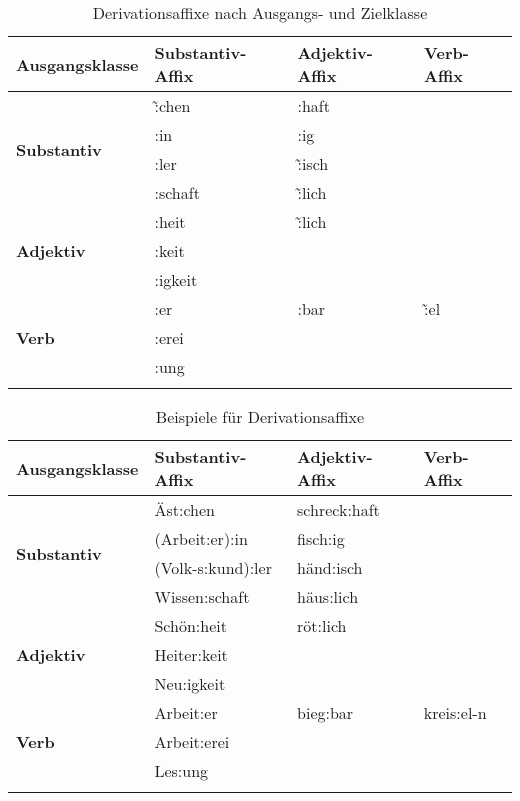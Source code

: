 \begin{table}[!htbp]
  \centering
  \begin{tabular}{llll}
    \lsptoprule
    \textbf{Ausgangsklasse} & \textbf{Substantiv-Affix} & \textbf{Adjektiv-Affix} & \textbf{Verb-Affix} \\
   \midrule
   \multirow{4}{*}{\textbf{Substantiv}} & \~:chen & :haft & \\
   & :in & :ig & \\
   & :ler & \~:isch & \\
   & :schaft & \~:lich & \\
   \midrule
   \multirow{3}{*}{\textbf{Adjektiv}} & :heit & \~:lich & \\
    & :keit && \\
    & :igkeit && \\
   \midrule
   \multirow{3}{*}{\textbf{Verb}} & :er & :bar & \~:el \\
   & :erei && \\
   & :ung && \\
   \lspbottomrule
  \end{tabular}
  \caption{Derivationsaffixe nach Ausgangs- und Zielklasse}
  \label{tab:derivaffixe}
\end{table}

\begin{table}[!htbp]
  \centering
  \begin{tabular}{llll}
    \lsptoprule
    \textbf{Ausgangsklasse} & \textbf{Substantiv-Affix} & \textbf{Adjektiv-Affix} & \textbf{Verb-Affix} \\
   \midrule
   \multirow{4}{*}{\textbf{Substantiv}} & Äst:chen & schreck:haft & \\
   & (Arbeit:er):in & fisch:ig & \\
   & (Volk-s:kund):ler & händ:isch & \\
   & Wissen:schaft & häus:lich & \\
   \midrule
   \multirow{3}{*}{\textbf{Adjektiv}} & Schön:heit & röt:lich & \\
    & Heiter:keit && \\
    & Neu:igkeit && \\
   \midrule
   \multirow{3}{*}{\textbf{Verb}} & Arbeit:er & bieg:bar & kreis:el-n \\
   & Arbeit:erei && \\
   & Les:ung && \\
   \lspbottomrule
  \end{tabular}
  \caption{Beispiele für Derivationsaffixe}
  \label{tab:derivaffixex}
\end{table}

